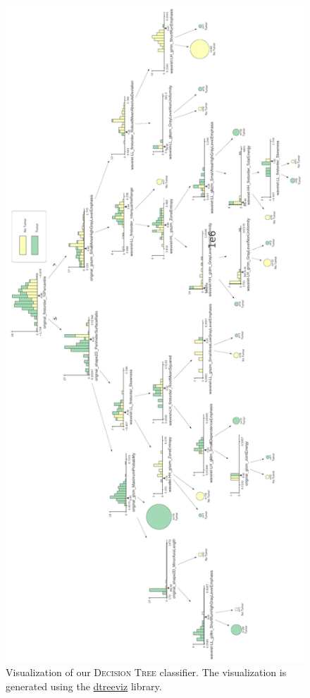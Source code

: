 \begin{figure}[t]
    \centering
    \includegraphics[width=1\linewidth]{figures/decision_tree}
    \caption{Visualization of our \textsc{Decision Tree} classifier. The visualization is generated using the \href{https://github.com/parrt/dtreeviz}{dtreeviz} library.}
    \label{fig:decision_tree}
\end{figure}

